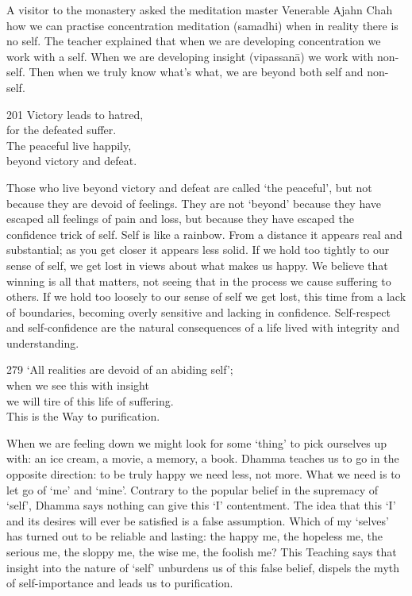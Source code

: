 \begin{dhpRefl}
A visitor to the monastery asked the meditation master Venerable Ajahn Chah how we can practise concentration meditation (samadhi) when in reality there is no self. The teacher explained that when we are developing concentration we work with a self. When we are developing insight (vipassanā) we work with non-self. Then when we truly know what's what, we are beyond both self and non-self.
\end{dhpRefl}


\begin{dhpVerse}{201}
\label{dhp-201}
Victory leads to hatred,\\
for the defeated suffer.\\
The peaceful live happily,\\
beyond victory and defeat.
\end{dhpVerse}

\begin{dhpRefl}
Those who live beyond victory and defeat are called `the peaceful', but not because they are devoid of feelings. They are not `beyond' because they have escaped all feelings of pain and loss, but because they have escaped the confidence trick of self. Self is like a rainbow. From a distance it appears real and substantial; as you get closer it appears less solid. If we hold too tightly to our sense of self, we get lost in views about what makes us happy. We believe that winning is all that matters, not seeing that in the process we cause suffering to others. If we hold too loosely to our sense of self we get lost, this time from a lack of boundaries, becoming overly sensitive and lacking in confidence. Self-respect and self-confidence are the natural consequences of a life lived with integrity and understanding.
\end{dhpRefl}


\begin{dhpVerse}{279}
\label{dhp-279}
`All realities are devoid of an abiding self';\\
when we see this with insight\\
we will tire of this life of suffering.\\
This is the Way to purification.
\end{dhpVerse}

\begin{dhpRefl}
When we are feeling down we might look for some `thing' to pick ourselves up with: an ice cream, a movie, a memory, a book. Dhamma teaches us to go in the opposite direction: to be truly happy we need less, not more. What we need is to let go of `me' and `mine'. Contrary to the popular belief in the supremacy of `self', Dhamma says nothing can give this `I' contentment. The idea that this `I' and its desires will ever be satisfied is a false assumption. Which of my `selves' has turned out to be reliable and lasting: the happy me, the hopeless me, the serious me, the sloppy me, the wise me, the foolish me? This Teaching says that insight into the nature of `self' unburdens us of this false belief, dispels the myth of self-importance and leads us to purification.
\end{dhpRefl}

